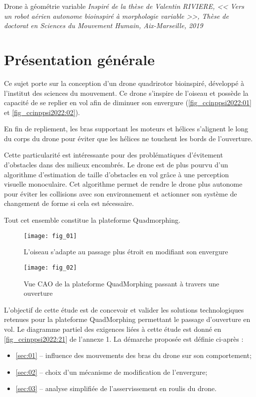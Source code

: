 
Drone à géométrie variable
\textit{Inspiré de la thèse de Valentin RIVIERE,
<< Vers un robot aérien autonome bio­inspiré à morphologie variable >>,
Thèse de doctorat en Sciences du Mouvement Humain, Aix-­Marseille, 2019}

\section*{Présentation générale}


Ce sujet porte sur la conception d’un drone quadrirotor bio­inspiré, développé à l’institut des
sciences du mouvement. Ce drone s’inspire de l’oiseau et possède la capacité de se replier
en vol afin de diminuer son envergure (\autoref{fig_ccinppsi2022:01} et \autoref{fig_ccinppsi2022:02}).

En fin de repliement, les bras supportant les moteurs et hélices s’alignent le long du corps
du drone pour éviter que les hélices ne touchent les bords de l’ouverture.

Cette particularité est intéressante pour des problématiques d’évitement d’obstacles dans
des milieux encombrés. Le drone est de plus pourvu d’un algorithme d’estimation de taille
d’obstacles en vol grâce à une perception visuelle monoculaire. Cet algorithme permet de
rendre le drone plus autonome pour éviter les collisions avec son environnement et actionner
son système de changement de forme si cela est nécessaire.

Tout cet ensemble constitue la plateforme Quadmorphing.


\begin{minipage}[c]{.48\linewidth}
\begin{figure}[H]
\centering
\texttt{[image: fig\_01]}
\caption{\label{fig_ccinppsi2022:01} L’oiseau s’adapte au passage
plus étroit en modifiant son envergure}
\end{figure}
\end{minipage}\hfill
\begin{minipage}[c]{.48\linewidth}
\begin{figure}[H]
\centering
\texttt{[image: fig\_02]}
\caption{\label{fig_ccinppsi2022:02} Vue CAO de la plateforme QuadMorphing passant à travers une ouverture}
\end{figure}
\end{minipage}

\begin{obj}
L'objectif de cette étude est de concevoir et valider les solutions technologiques retenues
pour la plateforme QuadMorphing permettant le passage d’ouverture en vol. Le diagramme
partiel des exigences liées à cette étude est donné en \autoref{fig_ccinppsi2022:21} de l’annexe 1.
La démarche proposée est définie ci­-après :
\begin{itemize}
\item ­\autoref{sec:01} --­ influence des mouvements des bras du drone sur son comportement;
\item ­\autoref{sec:02} --­ choix d’un mécanisme de modification de l’envergure;
\item ­\autoref{sec:03} --­ analyse simplifiée de l’asservissement en roulis du drone.
\end{itemize}
\end{obj}
